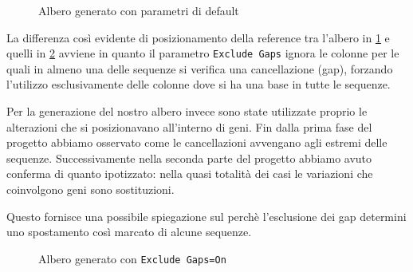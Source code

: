 \documentclass[11pt,italian]{article}
\begin{document}
\begin{figure}[H]
  \caption{Albero generato con parametri di default}
  \label{fig:tool-tree}
\end{figure}
\noindent
La differenza così evidente di posizionamento della reference tra l'albero in \cref{fig:tool-tree} e quelli in \cref{fig:tool-tree-skip} avviene in quanto il parametro \lstinline{Exclude Gaps} ignora le colonne per le quali in almeno una delle sequenze si verifica una cancellazione (gap), forzando l'utilizzo esclusivamente delle colonne dove si ha una base in tutte le sequenze.

Per la generazione del nostro albero invece sono state utilizzate proprio le alterazioni che si posizionavano all'interno di geni.
Fin dalla prima fase del progetto abbiamo osservato come le cancellazioni avvengano agli estremi delle sequenze. Successivamente nella seconda parte del progetto abbiamo avuto conferma di quanto ipotizzato: nella quasi totalità dei casi le variazioni che coinvolgono geni sono sostituzioni.

Questo fornisce una possibile spiegazione sul perchè l'esclusione dei gap determini uno spostamento così marcato di alcune sequenze.

\begin{figure}[]
  \caption{Albero generato con \lstinline{Exclude Gaps=On}}
  \label{fig:tool-tree-skip}
\end{figure}
\end{document}
